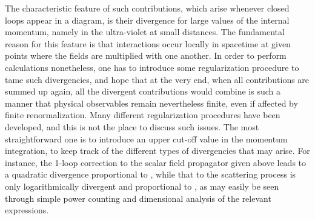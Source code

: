 \documentclass[a4paper,11pt]{article}
\begin{document}
The characteristic feature of such contributions, which arise whenever
closed loops appear in a diagram, is their divergence for large values 
of the internal momentum, namely in the ultra-violet at small distances.
The fundamental reason for this feature is that interactions occur locally
in spacetime at given points where the fields are multiplied with one another.
In order to perform calculations nonetheless, one has to introduce some
regularization procedure to tame such divergencies, and hope that at the
very end, when all contributions are summed up again, all the divergent
contributions would combine is such a manner that physical observables remain
nevertheless finite, even if affected by finite renormalization. Many different
regularization procedures have been developed, and this is not the place
to discuss such issues.\cite{Wein2,PS,IZ,Ramond} 
The most straightforward one is to introduce an
upper cut-off value \coordHE{} in the momentum integration,
to keep track of the different types of divergencies that may arise.
For instance, the 1-loop correction to the scalar field propagator given
above leads to a quadratic divergence proportional to \coordHE{},
while that to the \coordHE{} scattering process is only
logarithmically divergent and proportional to \coordHE{},
as may easily be seen through simple power counting and dimensional analysis
of the relevant expressions.
\end{document}
